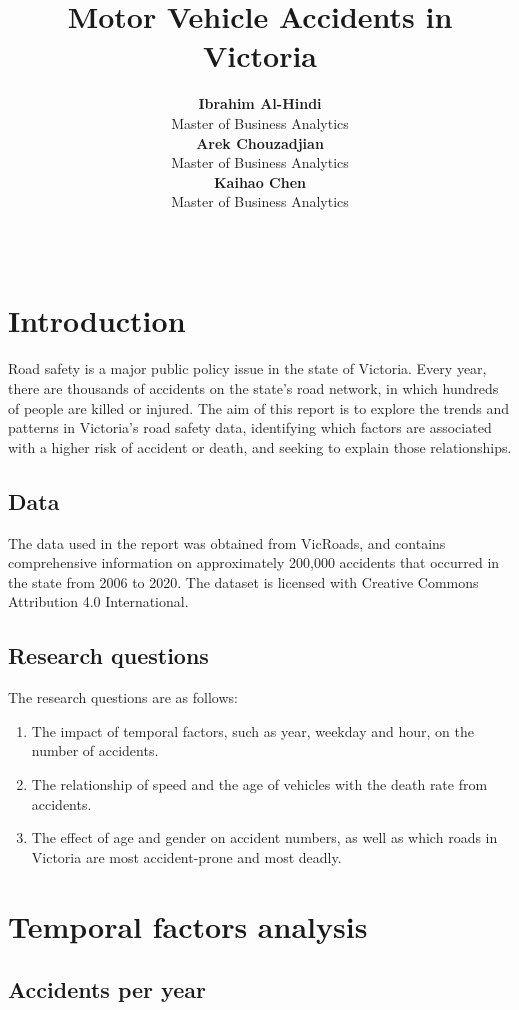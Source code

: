 \documentclass[11pt,a4paper,]{article}
\title{Motor Vehicle Accidents in Victoria}
\author{\sf\Large\textbf{ Ibrahim Al-Hindi}\\ {\sf\large Master of Business Analytics\\[0.5cm]} \sf\Large\textbf{ Arek Chouzadjian}\\ {\sf\large Master of Business Analytics\\[0.5cm]} \sf\Large\textbf{ Kaihao Chen}\\ {\sf\large Master of Business Analytics\\[0.5cm]}}
\date{\sf\Date~\Month~\Year}
\makeatletter
\def\titlepage{\front{\expandafter{\@title}}{\@author}{\@organization}}
\makeatother
\begin{document}
\titlepage

\section*{Introduction}

Road safety is a major public policy issue in the state of Victoria. Every year, there are thousands of accidents on the state's road network, in which hundreds of people are killed or injured. The aim of this report is to explore the trends and patterns in Victoria's road safety data, identifying which factors are associated with a higher risk of accident or death, and seeking to explain those relationships.

\subsection*{Data}

The data used in the report was obtained from VicRoads, and contains comprehensive information on approximately 200,000 accidents that occurred in the state from 2006 to 2020. The dataset is licensed with Creative Commons Attribution 4.0 International.

\subsection*{Research questions}

The research questions are as follows:

\begin{enumerate}
\def\labelenumi{\arabic{enumi}.}
\item
  The impact of temporal factors, such as year, weekday and hour, on the number of accidents.
\item
  The relationship of speed and the age of vehicles with the death rate from accidents.
\item
  The effect of age and gender on accident numbers, as well as which roads in Victoria are most accident-prone and most deadly.
\end{enumerate}

\section*{Temporal factors analysis}

\subsection*{Accidents per year}
\end{document}
